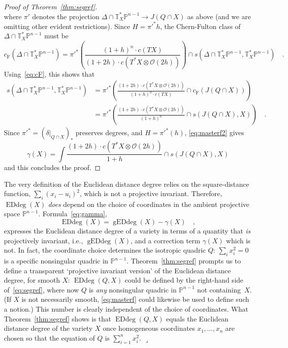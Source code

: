 \documentclass[11pt]{amsart}
\numberwithin{equation}{section}
\newcommand{\Pbb}{{\mathbb{P}}}
\newcommand{\Tbb}{{\mathbb{T}}}
\newcommand{\cO}{{\mathscr O}}
\newcommand{\cf}{{c_{\text{F}}}}
\DeclareMathOperator{\Edd}{EDdeg}
\DeclareMathOperator{\gEdd}{gEDdeg}
\newcommand{\qede}{\hfill$\lrcorner$}
\begin{document}
\begin{proof}[Proof of Theorem~\ref{thm:segref}]
\[\]
where $\pi'$ denotes the projection $\Delta\cap \Tbb^*_X\Pbb^{n-1} \to J(Q\cap X)$ as
above (and we are omitting other evident restrictions). 
Since $H={\pi'}^* h$, the Chern-Fulton class of $\Delta\cap \Tbb^*_X\Pbb^{n-1}$ must be
\[
\cf(\Delta\cap \Tbb^*_X\Pbb^{n-1}) = {\pi'}^*\left(
\frac{(1+h)^n\cdot c(TX)}{(1+2h)\cdot c(T^*X\otimes \cO(2h))}\right)\cap
s(\Delta\cap \Tbb^*_X\Pbb^{n-1} , \Tbb^*_X\Pbb^{n-1})\quad.
\]
Using~\eqref{eq:cF}, this shows that
\begin{align*}
s(\Delta\cap \Tbb^*_X\Pbb^{n-1} , \Tbb^*_X\Pbb^{n-1})
&={\pi'}^*\left(\frac{(1+2h)\cdot c(T^*X\otimes \cO(2h))}{(1+h)^n\cdot c(TX)}\cap \cf(J(Q\cap X))\right) \\
&={\pi'}^*\left(\frac{(1+2h)\cdot c(T^*X\otimes \cO(2h))}{(1+h)^n}\cap s(J(Q\cap X),X)\right) \quad.
\end{align*}
Since ${\pi'}^*=(\delta|_{Q\cap X})_*$ preserves degrees, and $H={\pi'}^*(h)$, 
\eqref{eq:masterf2} gives
\begin{equation}\label{eq:gamma2}
\gamma(X) = \int \frac{(1+2h)\cdot c(T^*X\otimes \cO(2h))}{1+h}\cap s(J(Q\cap X),X)
\end{equation}
and this concludes the proof.
\end{proof}

\begin{remark}\label{rem:QX}
The very definition of the Euclidean distance degree relies on the square-distance function,
$\sum_i (x_i - u_i)^2$, which is not a projective invariant. Therefore, $\Edd(X)$ {\em does\/}
depend on the choice of coordinates in the ambient projective space $\Pbb^{n-1}$.
Formula~\eqref{eq:gamma},
\[
\Edd(X) = \gEdd(X) - \gamma(X)\quad,
\]
expresses the Euclidean distance degree of a variety in terms of a quantity that {\em is\/}
projectively invariant, i.e., $\gEdd(X)$, and a correction term $\gamma(X)$ which is not.
In fact, the coordinate choice determines the isotropic quadric $Q$: $\sum_i x_i^2=0$
is a specific nonsingular quadric in $\Pbb^{n-1}$. Theorem~\ref{thm:segref} prompts us
to define a transparent `projective invariant version' of the Euclidean distance degree, 
for smooth $X$: $\Edd(Q,X)$ could be defined by the right-hand side of~\eqref{eq:segref},
where now $Q$ is {\em any\/} nonsingular quadric in $\Pbb^{n-1}$ not containing~$X$.
(If $X$ is not necessarily smooth, \eqref{eq:masterf} could likewise be used to define
such a notion.)
This number is clearly independent of the choice of coordinates.
What Theorem~\ref{thm:segref} shows is that $\Edd(Q,X)$ equals the Euclidean distance
degree 
of the variety $X$ once homogeneous coordinates $x_1,\dots, x_n$ are chosen 
so that the equation of $Q$ is $\sum_{i=1}^n x_i^2$.
\qede\end{remark}
\end{document}
